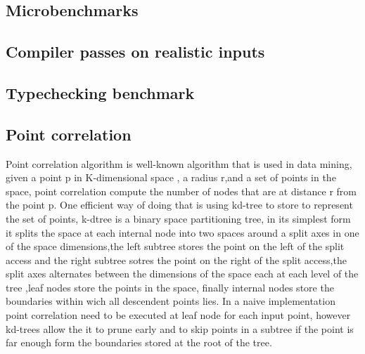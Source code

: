 \documentclass[preprint,10pt,nocopyrightspace,nonatbib]{./bibs/sigplanconf}
\begin{document}

\subsection{Microbenchmarks}



\subsection{Compiler passes on realistic inputs}



\subsection{Typechecking benchmark}


\subsection{Point correlation}

\note{}
Point correlation algorithm is well-known algorithm that is used in data mining\cite{capnproto},
given a point p in K-dimensional space , a radius r,and a set of points in the space,
point correlation compute the number of nodes that are at distance r from the point p.
One efficient way of doing that is using kd-tree to store to represent the set of points\cite{capnproto}, 
k-dtree is a binary space partitioning tree, in its simplest form it splits the space at each internal node into two spaces
around a split axes in one of the space dimensions,the left subtree stores the point on the left of the split access
and the right subtree sotres the point on the right of the split access,the split axes alternates between the dimensions of
the space each at each level of the tree ,leaf nodes store the points in the space, finally internal nodes  store the
boundaries within wich all descendent points lies. In  a naive implementation point correlation need to be executed at leaf node for each input point, however kd-trees 
allow the it to  prune early and to skip points in a subtree if the point is far enough form the boundaries stored at the root 
of the tree.
\end{document}

